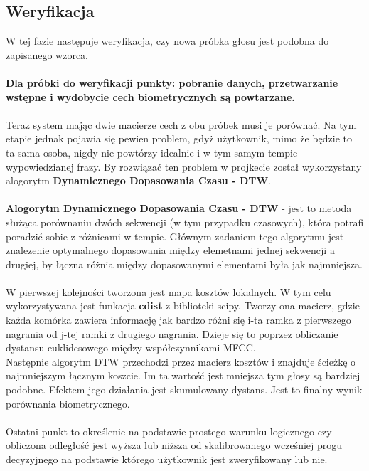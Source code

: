 \subsection{Weryfikacja}
W tej fazie następuje weryfikacja, czy nowa próbka głosu jest podobna do zapisanego wzorca.
\\
\\
\textbf{Dla próbki do weryfikacji punkty: pobranie danych, przetwarzanie wstępne i wydobycie cech biometrycznych są powtarzane.}
\\
\\
Teraz system mając dwie macierze cech z obu próbek musi je porównać. Na tym etapie jednak pojawia się pewien problem, gdyż użytkownik, mimo że będzie to ta sama osoba, nigdy nie powtórzy idealnie i w tym samym tempie wypowiedzianej frazy. By rozwiązać ten problem w projkecie został wykorzystany alogorytm \textbf{Dynamicznego Dopasowania Czasu - DTW}.
\\
\\
\textbf{Alogorytm Dynamicznego Dopasowania Czasu - DTW} - jest to metoda służąca porównaniu dwóch sekwencji (w tym przypadku czasowych), która potrafi poradzić sobie z różnicami w tempie.
Głównym zadaniem tego algorytmu jest znalezenie optymalnego dopasowania między elemetnami jednej sekwencji a drugiej, by łączna różnia między dopasowanymi elementami była jak najmniejsza.
\\
\\
W pierwszej kolejności tworzona jest mapa kosztów lokalnych. W tym celu wykorzystywana jest funkacja \textbf{cdist} z biblioteki scipy. Tworzy ona macierz, gdzie każda komórka zawiera informację jak bardzo różni się i-ta ramka z pierwszego nagrania od j-tej ramki z drugiego nagrania. Dzieje się to poprzez obliczanie dystansu euklidesowego między współczynnikami MFCC.
\newline
\\
Następnie algorytm DTW przechodzi przez macierz kosztów i znajduje ścieżkę o najmniejszym łącznym koszcie. Im ta wartość jest mniejsza tym głosy są bardziej podobne.
Efektem jego działania jest skumulowany dystans. Jest to finalny wynik porównania biometrycznego.
\\
\\
Ostatni punkt to określenie na podstawie prostego warunku logicznego czy obliczona odległość jest wyższa lub niższa od skalibrowanego wcześniej progu decyzyjnego na podstawie którego użytkownik jest zweryfikowany lub nie.  

